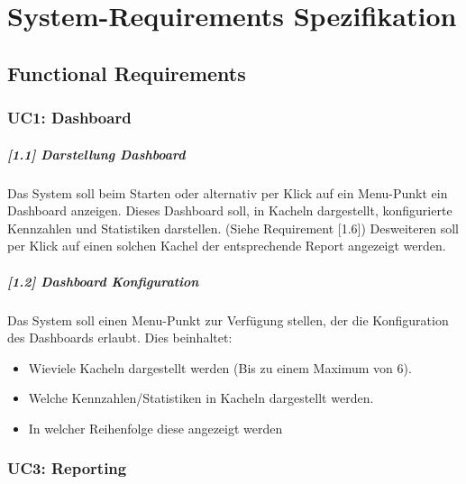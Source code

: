 \documentclass[a4paper]{scrreprt}
\begin{document}
\chapter{System-Requirements Spezifikation}

\section{Functional Requirements}
\subsection{UC1: Dashboard}
\paragraph{[1.1] Darstellung Dashboard}
Das System soll beim Starten oder alternativ per Klick auf ein Menu-Punkt ein Dashboard anzeigen. Dieses Dashboard soll, in Kacheln dargestellt, konfigurierte Kennzahlen und Statistiken darstellen. (Siehe Requirement [1.6]) Desweiteren soll per Klick auf einen solchen Kachel der entsprechende Report angezeigt werden. 
 	
\paragraph{[1.2] Dashboard Konfiguration}
Das System soll einen Menu-Punkt zur Verfügung stellen, der die Konfiguration des Dashboards erlaubt. Dies beinhaltet: 
\begin{itemize}
\item Wieviele Kacheln dargestellt werden (Bis zu einem Maximum von 6).
\item Welche Kennzahlen/Statistiken in Kacheln dargestellt werden.
\item In welcher Reihenfolge diese angezeigt werden
\end{itemize}

\subsection{UC3: Reporting}
\end{document}
